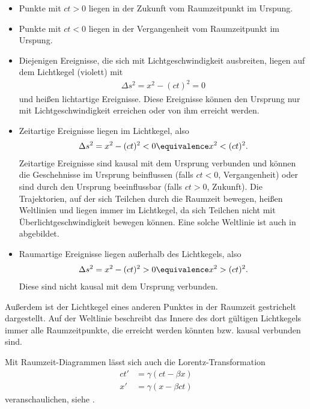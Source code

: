 \begin{itemize}
    \item Punkte mit $ct>0$ liegen in der Zukunft vom Raumzeitpunkt im Urspung.
    \item Punkte mit $ct<0$ liegen in der Vergangenheit vom Raumzeitpunkt im Urspung.
    \item Diejenigen Ereignisse, die sich mit Lichtgeschwindigkeit ausbreiten, liegen auf dem Lichtkegel (violett) mit
          \begin{align*}
              \Delta s^2=x^2-(ct)^2=0
          \end{align*}
          und heißen lichtartige Ereignisse. Diese Ereignisse können den Ursprung nur mit Lichtgeschwindigkeit erreichen oder von ihm erreicht werden.
    \item Zeitartige Ereignisse liegen im Lichtkegel, also
          \begin{align*}
              \Delta s^2 = x^2-(ct)^2 < 0 \equivalence x^2 < (ct)^2.
          \end{align*}
          Zeitartige Ereignisse sind kausal mit dem Ursprung verbunden und können die Geschehnisse im Ursprung beinflussen (falls $ct<0$, Vergangenheit) oder sind durch den Ursprung
          beeinflussbar (falls $ct>0$, Zukunft). Die Trajektorien, auf der sich Teilchen durch die Raumzeit bewegen, heißen Weltlinien und liegen immer im Lichtkegel, da sich Teilchen nicht mit
          Überlichtgeschwindigkeit bewegen können. Eine solche Weltlinie ist auch in  abgebildet.
    \item Raumartige Ereignisse liegen außerhalb des Lichtkegels, also
          \begin{align*}
              \Delta s^2 = x^2-(ct)^2 > 0 \equivalence x^2 > (ct)^2.
          \end{align*}
          Diese sind nicht kausal mit dem Ursprung verbunden.
\end{itemize}

Außerdem ist der Lichtkegel eines anderen Punktes in der Raumzeit gestrichelt dargestellt.
Auf der Weltlinie beschreibt das Innere des dort gültigen Lichtkegels immer alle Raumzeitpunkte, die erreicht werden könnten bzw. kausal verbunden sind.


Mit Raumzeit-Diagrammen lässt sich auch die Lorentz-Transformation
\begin{align*}
    ct' & =\gamma(ct-\beta x) \\
    x'  & =\gamma(x-\beta ct)
\end{align*}
veranschaulichen, siehe .

